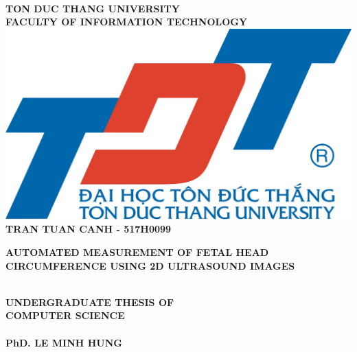 \thispagestyle{empty}
\vspace{1cm}
\begin{center}
{\fontsize{14pt}{1}\selectfont {VIETNAM GENERAL CONFEDERATION OF LABOUR}}\\
{\fontsize{14pt}{1}\selectfont \textbf{TON DUC THANG UNIVERSITY}}\\
{\fontsize{14pt}{1}\selectfont \textbf{FACULTY OF INFORMATION TECHNOLOGY}}\\[1cm]
\includegraphics[scale=0.3]{./hinhanh/tdt.jpg}\\[1.7cm]
{\fontsize{14pt}{1}\selectfont \textbf{TRAN TUAN CANH - 517H0099}}\\[1.2cm]

{\parbox[t]{15cm}{\fontsize{22pt}{15}\selectfont 
	\begin{center}
			\textbf{AUTOMATED MEASUREMENT OF FETAL HEAD CIRCUMFERENCE USING 2D ULTRASOUND IMAGES}
	\end{center}}
}\\[1.3cm]

{\fontsize{20pt}{1}\selectfont \textbf{UNDERGRADUATE THESIS OF}}\\
{\fontsize{20pt}{1}\selectfont \textbf{COMPUTER SCIENCE}}\\[1cm]

{\fontsize{14pt}{1}\selectfont {Advised by}}\\
{\fontsize{14pt}{1}\selectfont \textbf{PhD. LE MINH HUNG}}\\

\end{center}


